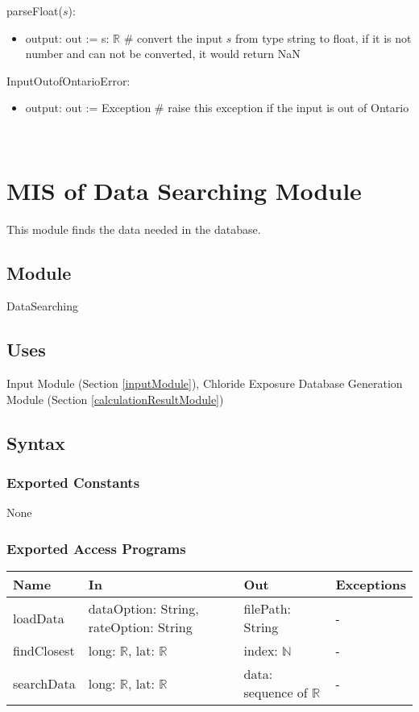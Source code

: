 \documentclass[12pt, titlepage]{article}
\begin{document}
\noindent parseFloat($s$):
\begin{itemize}
\item output: out := s: $\mathbb{R}$ \# convert the input $s$ from type string to float, if it is not number and can not be converted, it would return NaN 
\end{itemize}

\noindent InputOutofOntarioError:
\begin{itemize}
\item output: out := Exception \# raise this exception if the input is out of Ontario 
\end{itemize}
  
~\newpage

\section{MIS of Data Searching Module} \label{dataSearchingModule} 
This module finds the data needed in the database.
\subsection{Module}

DataSearching

\subsection{Uses}
 Input Module (Section \ref{inputModule}), Chloride Exposure Database Generation Module (Section \ref{calculationResultModule})



\subsection{Syntax}

\subsubsection{Exported Constants}
None
\subsubsection{Exported Access Programs}

\begin{center}
\begin{tabular}{p{2cm} p{4cm} p{4cm} p{4cm}}
\hline
\textbf{Name} & \textbf{In} & \textbf{Out} & \textbf{Exceptions} \\
\hline
loadData & dataOption: String, rateOption: String & filePath: String & - \\
findClosest & long: $\mathbb{R}$, lat: $\mathbb{R}$ & index: $\mathbb{N}$   & - \\
searchData & long: $\mathbb{R}$, lat: $\mathbb{R}$  & data: sequence of  $\mathbb{R}$ & - \\
\hline
\end{tabular}
\end{center}
\end{document}

